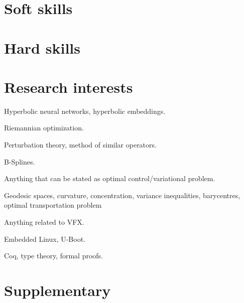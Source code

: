 \documentclass[10pt,a4paper]{moderncv}
\begin{document}
\section{Soft skills}

\section{Hard skills}
\begin{multicols}{2}
\end{multicols}

\section{Research interests}
\begin{itemize*}
    \item{Hyperbolic neural networks, hyperbolic embeddings.}
    \item{Riemannian optimization.}
    \item{Perturbation theory, method of similar operators.}
    \item{B-Splines.}
    \item{Anything that can be stated as optimal control/variational problem.}
    \item{Geodesic spaces, curvature, concentration, variance inequalities, barycentres, optimal transportation problem}
    \item{Anything related to VFX.}
    \item{Embedded Linux, U-Boot.}
    \item{Coq, type theory, formal proofs.}
\end{itemize*}

\newpage
\section{Supplementary}
\end{document}
